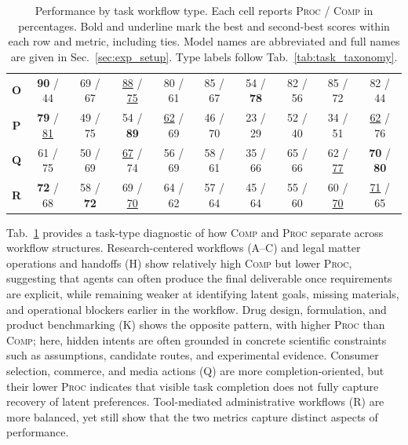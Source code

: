 \documentclass{llmxive}
\providecommand{\tasktypepair}[2]{#1 / #2}
\begin{document}
{\begin{table}[tb]
{\begin{tabular}{c|ccccccccc}
\textbf{O} & \tasktypepair{\textbf{90}}{44} & \tasktypepair{69}{67} & \tasktypepair{\underline{88}}{\underline{75}} & \tasktypepair{80}{61} & \tasktypepair{85}{67} & \tasktypepair{54}{\textbf{78}} & \tasktypepair{82}{56} & \tasktypepair{85}{72} & \tasktypepair{82}{44} \\
\textbf{P} & \tasktypepair{\textbf{79}}{\underline{81}} & \tasktypepair{49}{75} & \tasktypepair{54}{\textbf{89}} & \tasktypepair{\underline{62}}{69} & \tasktypepair{46}{70} & \tasktypepair{23}{29} & \tasktypepair{52}{40} & \tasktypepair{34}{51} & \tasktypepair{\underline{62}}{76} \\
\textbf{Q} & \tasktypepair{61}{75} & \tasktypepair{50}{69} & \tasktypepair{\underline{67}}{74} & \tasktypepair{56}{69} & \tasktypepair{58}{61} & \tasktypepair{35}{66} & \tasktypepair{65}{66} & \tasktypepair{62}{\underline{77}} & \tasktypepair{\textbf{70}}{\textbf{80}} \\
\textbf{R} & \tasktypepair{\textbf{72}}{68} & \tasktypepair{58}{\textbf{72}} & \tasktypepair{69}{\underline{70}} & \tasktypepair{64}{62} & \tasktypepair{57}{64} & \tasktypepair{45}{64} & \tasktypepair{55}{60} & \tasktypepair{60}{\underline{70}} & \tasktypepair{\underline{71}}{65} \\
\bottomrule[1.25pt]
\end{tabular}
}
\vspace{-6pt}
\caption{Performance by task workflow type. Each cell reports \textsc{Proc} / \textsc{Comp} in percentages. Bold and underline mark the best and second-best scores within each row and metric, including ties. Model names are abbreviated and full names are given in Sec.~\ref{sec:exp_setup}. Type labels follow Tab.~\ref{tab:task_taxonomy}.}
\label{tab:task_type_scores}
\end{table}
}

Tab.~\ref{tab:task_type_scores} provides a task-type diagnostic of how \textsc{Comp} and \textsc{Proc} separate across workflow structures. Research-centered workflows (A--C) and legal matter operations and handoffs (H) show relatively high \textsc{Comp} but lower \textsc{Proc}, suggesting that agents can often produce the final deliverable once requirements are explicit, while remaining weaker at identifying latent goals, missing materials, and operational blockers earlier in the workflow. Drug design, formulation, and product benchmarking (K) shows the opposite pattern, with higher \textsc{Proc} than \textsc{Comp}; here, hidden intents are often grounded in concrete scientific constraints such as assumptions, candidate routes, and experimental evidence. Consumer selection, commerce, and media actions (Q) are more completion-oriented, but their lower \textsc{Proc} indicates that visible task completion does not fully capture recovery of latent preferences. Tool-mediated administrative workflows (R) are more balanced, yet still show that the two metrics capture distinct aspects of performance.
\end{document}
